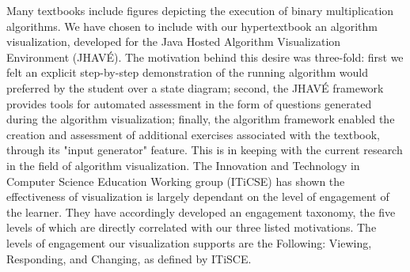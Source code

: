 \documentclass{acm_proc_article-sp}
\begin{document}
Many textbooks include figures depicting the execution of binary multiplication algorithms.  We have chosen to include with our hypertextbook an algorithm visualization, developed for the Java Hosted Algorithm Visualization Environment (JHAVÉ). The motivation behind this desire was three-fold: first we felt an explicit step-by-step demonstration of the running algorithm would preferred by the student over a state diagram; second, the JHAVÉ framework provides tools for automated assessment in the form of questions generated during the algorithm visualization; finally, the algorithm framework enabled the creation and assessment of additional exercises associated with the textbook, through its "input generator" feature.  This is in keeping with the current research in the field of algorithm visualization\cite{needsCitation}.  The Innovation and Technology in Computer Science Education Working group (ITiCSE) has shown the effectiveness of visualization is largely dependant on the level of engagement of the learner\cite{needsCitation}.  They have accordingly developed an engagement taxonomy, the five levels of which are directly correlated with our three listed motivations.  The levels of engagement our visualization supports are the Following: Viewing, Responding, and Changing, as defined by ITiSCE.

\balancecolumns
\end{document}
